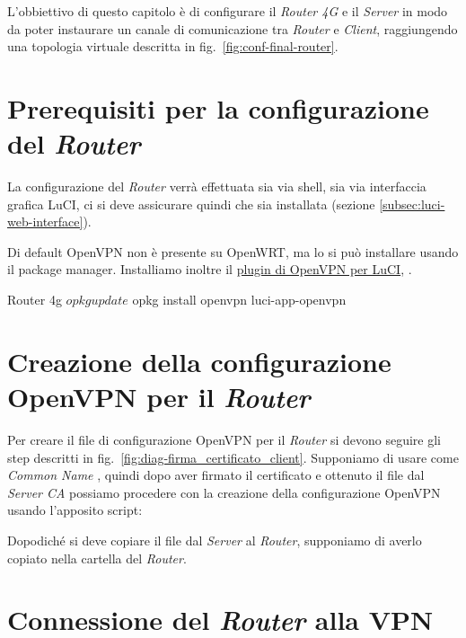 L'obbiettivo di questo capitolo è di configurare il \textit{Router 4G} e il \textit{Server} in modo da poter instaurare un canale di comunicazione tra \textit{Router} e \textit{Client}, raggiungendo una topologia virtuale descritta in fig.~\ref{fig:conf-final-router}.

\section{Prerequisiti per la configurazione del \textit{Router} \ok}

La configurazione del \textit{Router} verrà effettuata sia via shell, sia via interfaccia grafica LuCI, ci si deve assicurare quindi che sia installata (sezione \ref{subsec:luci-web-interface}).

Di default OpenVPN non è presente su OpenWRT, ma lo si può installare usando il package manager. Installiamo inoltre il \href{https://openwrt.org/docs/guide-user/services/vpn/openvpn/client-luci}{plugin di OpenVPN per LuCI}, .

\begin{bashcode}{Router 4g}{}
$ opkg update
$ opkg install openvpn luci-app-openvpn
\end{bashcode}

\section{Creazione della configurazione OpenVPN per il \textit{Router} \ok}

Per creare il file di configurazione OpenVPN per il \textit{Router} si devono seguire gli step descritti in fig.~\ref{fig:diag-firma_certificato_client}. Supponiamo di usare come \textit{Common Name} , quindi dopo aver firmato il certificato e ottenuto il file  dal \textit{Server CA} possiamo procedere con la creazione della configurazione OpenVPN usando l'apposito script:


Dopodiché si deve copiare il file  dal \textit{Server} al \textit{Router}, supponiamo di averlo copiato nella cartella  del \textit{Router}. 


\section{Connessione del \textit{Router} alla VPN \ok}

